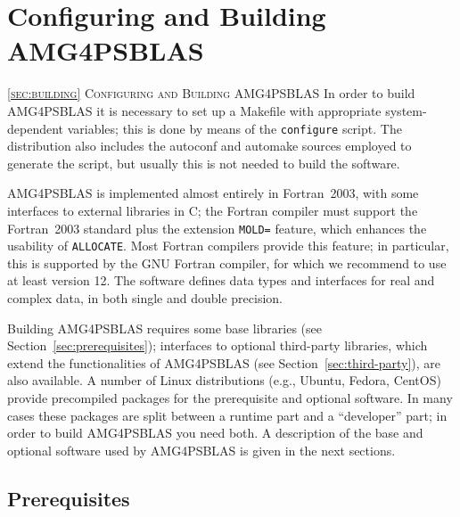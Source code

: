 \section{Configuring and Building AMG4PSBLAS\label{sec:building}}
         {\textsc{\ref{sec:building} Configuring and Building AMG4PSBLAS}}
In order to build AMG4PSBLAS it is necessary to set up a Makefile with appropriate
system-dependent variables; this is done by means of the \verb|configure|
script. The distribution also includes the autoconf and automake
sources employed to generate the script, but usually this is not needed
to build the software.

AMG4PSBLAS is implemented almost entirely in Fortran~2003, with some
interfaces to external libraries in C; the Fortran compiler
must support the Fortran~2003 standard plus the extension \verb|MOLD=|
feature, which enhances the usability of \verb|ALLOCATE|.
Most Fortran compilers provide  this feature; in particular, this is
supported by the GNU Fortran compiler, for which we recommend to use at least version 12.
The software defines data types and interfaces for
real and complex data, in both single and double precision.

Building AMG4PSBLAS requires some base libraries (see
Section~\ref{sec:prerequisites}); interfaces to optional third-party 
libraries, which extend the functionalities of AMG4PSBLAS (see
Section~\ref{sec:third-party}), are also available.  A number of Linux 
distributions (e.g., Ubuntu, Fedora, CentOS) provide precompiled 
packages for the prerequisite and optional software. In many cases
these packages are split between a runtime part and a ``developer''
part; in order to build AMG4PSBLAS you need both. A description of the
base and optional software used by AMG4PSBLAS is given in the next
sections. 

\subsection{Prerequisites\label{sec:prerequisites}}

